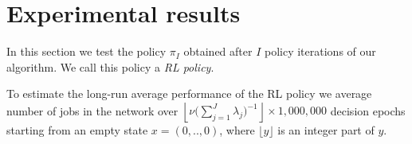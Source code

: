 \documentclass[11pt]{article}
\theoremstyle{definition}
\numberwithin{equation}{section}
\begin{document}
%
%
%
%
%
%
%
%
%
%
%







%
%
%
%
%
%
%
%








\section{Experimental results}\label{Experiments}
In this section we test the policy $\pi_I$ obtained after $I$ policy iterations of our algorithm. We call this policy a \emph{RL policy}.


To estimate the long-run average performance of the RL policy  we average number of jobs in the network over
$ \left \lfloor \nu \Big(\sum\limits_{j=1}^J \lambda _j\Big)^{-1}\right \rfloor \times 1,000,000
$ decision epochs starting from an empty state $x = (0,..,0)$, where $\lfloor y\rfloor$ is an integer part of $y$.
\end{document}
